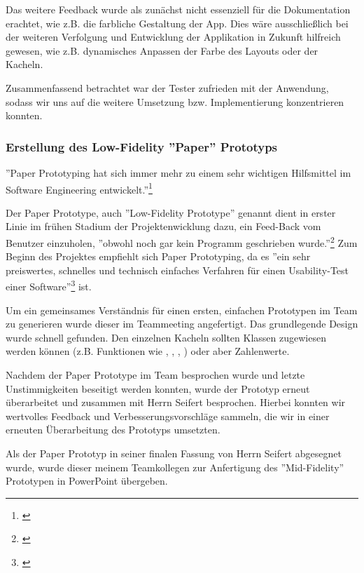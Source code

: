 Das weitere Feedback wurde als zunächst nicht essenziell für die Dokumentation erachtet, wie z.B. die farbliche Gestaltung der App. Dies wäre ausschließlich bei der weiteren Verfolgung und Entwicklung der Applikation in Zukunft hilfreich gewesen, wie z.B. dynamisches Anpassen der Farbe des Layouts oder der Kacheln. 

Zusammenfassend betrachtet war der Tester zufrieden mit der Anwendung, sodass wir uns auf die weitere Umsetzung bzw. Implementierung konzentrieren konnten. 

\subsubsection{Erstellung des Low-Fidelity ''Paper'' Prototyps}
\label{subsubsection:erstellung-low-fidelity-paper}

''Paper Prototyping hat sich immer mehr zu einem sehr wichtigen Hilfsmittel im Software Engineering entwickelt.''\footnote{\cite[][]{paperPrototypeGentgesxy2002a}}

Der Paper Prototype, auch ''Low-Fidelity Prototype'' genannt dient in erster Linie im frühen Stadium der Projektenwicklung dazu, ein Feed-Back vom Benutzer einzuholen, ''obwohl noch gar kein Programm geschrieben wurde.''\footnote{\cite[][]{paperPrototypeGentgesxy2002a}}  Zum Beginn des Projektes empfiehlt sich Paper Prototyping, da es ''ein sehr preiswertes, schnelles und technisch einfaches Verfahren für einen Usability-Test einer Software''\footnote{\cite[][]{paperPrototypeGentgesxy2002a}} ist.

Um ein gemeinsames Verständnis für einen ersten, einfachen Prototypen im Team zu generieren wurde dieser im Teammeeting angefertigt. Das grundlegende Design wurde schnell gefunden. Den einzelnen Kacheln sollten Klassen zugewiesen werden können (z.B. Funktionen wie , ,  , ) oder aber Zahlenwerte. 

Nachdem der Paper Prototype im Team besprochen wurde und letzte Unstimmigkeiten beseitigt werden konnten, wurde der Prototyp erneut überarbeitet und zusammen mit Herrn Seifert besprochen. Hierbei konnten wir wertvolles Feedback und Verbesserungsvorschläge sammeln, die wir in einer erneuten Überarbeitung des Prototyps umsetzten. 

Als der Paper Prototyp in seiner finalen Fassung von Herrn Seifert abgesegnet wurde, wurde dieser meinem Teamkollegen zur Anfertigung des ''Mid-Fidelity'' Prototypen in PowerPoint übergeben.

